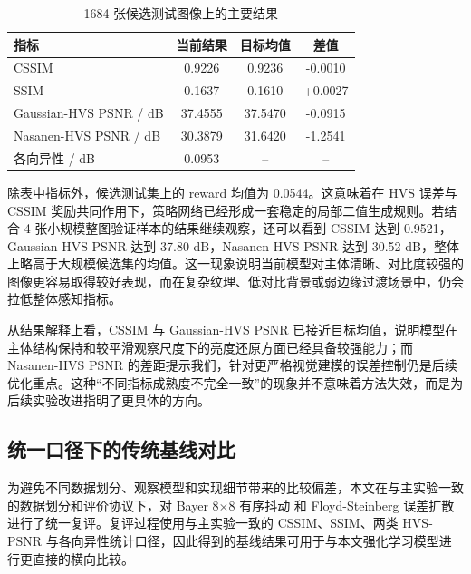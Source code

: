 \documentclass[thesis]{../zstucs-graduation-project}
\begin{document}
\begin{table}[H]
    \centering
    \caption{1684 张候选测试图像上的主要结果}
    \label{tab:5-1}
    \begin{tabular}{lccc}
        \toprule
        指标 & 当前结果 & 目标均值 & 差值 \\
        \midrule
        CSSIM & 0.9226 & 0.9236 & -0.0010 \\
        SSIM & 0.1637 & 0.1610 & +0.0027 \\
        Gaussian-HVS PSNR / dB & 37.4555 & 37.5470 & -0.0915 \\
        Nasanen-HVS PSNR / dB & 30.3879 & 31.6420 & -1.2541 \\
        各向异性 / dB & 0.0953 & -- & -- \\
        \bottomrule
    \end{tabular}
\end{table}

除表中指标外，候选测试集上的 reward 均值为 0.0544。这意味着在 HVS 误差与 CSSIM 奖励共同作用下，策略网络已经形成一套稳定的局部二值生成规则。若结合 4 张小规模整图验证样本的结果继续观察，还可以看到 CSSIM 达到 0.9521，Gaussian-HVS PSNR 达到 37.80 dB，Nasanen-HVS PSNR 达到 30.52 dB，整体上略高于大规模候选集的均值。这一现象说明当前模型对主体清晰、对比度较强的图像更容易取得较好表现，而在复杂纹理、低对比背景或弱边缘过渡场景中，仍会拉低整体感知指标。

从结果解释上看，CSSIM 与 Gaussian-HVS PSNR 已接近目标均值，说明模型在主体结构保持和较平滑观察尺度下的亮度还原方面已经具备较强能力；而 Nasanen-HVS PSNR 的差距提示我们，针对更严格视觉建模的误差控制仍是后续优化重点。这种“不同指标成熟度不完全一致”的现象并不意味着方法失效，而是为后续实验改进指明了更具体的方向。

\subsection{统一口径下的传统基线对比}
为避免不同数据划分、观察模型和实现细节带来的比较偏差，本文在与主实验一致的数据划分和评价协议下，对 Bayer 8\(\times\)8 有序抖动\cite{BAYER1973An} 和 Floyd-Steinberg 误差扩散\cite{FLOYD1976An} 进行了统一复评。复评过程使用与主实验一致的 CSSIM、SSIM、两类 HVS-PSNR 与各向异性统计口径，因此得到的基线结果可用于与本文强化学习模型进行更直接的横向比较。
\end{document}

